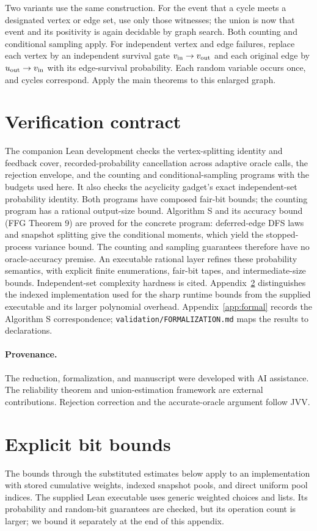 \documentclass[11pt]{article}
\begin{document}
Two variants use the same construction. For the event that a cycle meets
a designated vertex or edge set, use only those witnesses; the union is
now that event and its positivity is again decidable by graph search.
Both counting and conditional sampling apply. For independent vertex and
edge failures, replace each vertex by an independent survival gate
$v_{\rm in}\to v_{\rm out}$ and each original edge by
$u_{\rm out}\to v_{\rm in}$ with its edge-survival probability. Each random
variable occurs once, and cycles correspond. Apply the main theorems to
this enlarged graph.

\section{Verification contract}
The companion Lean development checks the vertex-splitting identity and
feedback cover, recorded-probability cancellation across adaptive oracle
calls, the rejection envelope, and the counting and conditional-sampling
programs with the budgets used here. It also checks the acyclicity gadget's
exact independent-set probability identity. Both programs have composed
fair-bit bounds; the counting program has a rational output-size bound.
Algorithm S and its accuracy bound (FFG Theorem 9) are proved for the
concrete program: deferred-edge DFS laws and snapshot splitting give the
conditional moments, which yield the stopped-process variance bound.
The counting and sampling guarantees therefore have no oracle-accuracy
premise. An executable rational layer refines these probability semantics,
with explicit finite enumerations, fair-bit tapes, and intermediate-size
bounds. Independent-set complexity hardness is cited. Appendix~\ref{app:cost}
distinguishes the indexed implementation used for the sharp runtime bounds
from the supplied executable and its larger polynomial overhead.
Appendix~\ref{app:formal} records the Algorithm S correspondence;
\texttt{validation/FORMALIZATION.md} maps the results to declarations.

\paragraph{Provenance.}
The reduction, formalization, and manuscript were developed with AI assistance.
The reliability theorem and union-estimation framework are external contributions.
Rejection correction and the accurate-oracle argument follow JVV.

\clearpage
\appendix
\section{Explicit bit bounds}\label{app:cost}
The bounds through the substituted estimates below apply to an implementation
with stored cumulative weights, indexed snapshot pools, and direct uniform
pool indices. The supplied Lean executable uses generic weighted choices and
lists. Its probability and random-bit guarantees are checked, but its
operation count is larger; we bound it separately at the end of this appendix.
\end{document}

